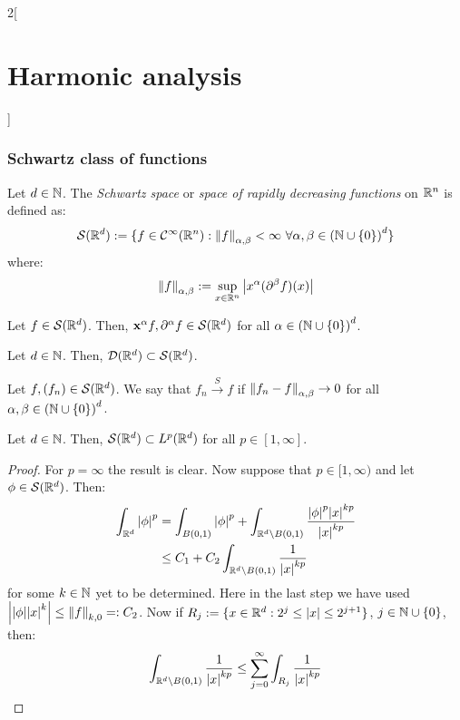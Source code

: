 \documentclass[../../../main_math.tex]{subfiles}
\begin{document}
\begin{multicols}{2}[\section{Harmonic analysis}]
  \subsubsection{Schwartz class of functions}
  \begin{definition}
    Let $d\in\mathbb{N}$. The \emph{Schwartz space} or \emph{space of rapidly decreasing functions} on $\mathbb{R}^n$ is defined as:
    $$
      \mathcal{S}(\RR^d):=\{f\in \mathcal{C}^\infty(\RR^n):\norm{f}_{\alpha,\beta}<\infty\ \forall\alpha,\beta\in{(\NN\cup\{0\})}^d\}
    $$
    where:
    $$
      \left\|f\right\|_{\alpha,\beta}:=\sup_{x\in\mathbb{R}^n}\abs{x^\alpha (\partial^\beta f)(x)}
    $$
  \end{definition}
  \begin{lemma}
    Let $f\in \mathcal{S}(\mathbb{R}^d)$. Then, ${\boldsymbol{\mathrm{x}}}^\alpha f,\partial^\alpha f\in \mathcal{S}(\mathbb{R}^d)$ for all $\alpha\in{(\ensuremath{\mathbb{N}}\cup\{0\})}^d$.
  \end{lemma}
  \begin{lemma}
    Let $d\in\mathbb{N}$. Then, $\mathcal{D}(\mathbb{R}^d)\subset\mathcal{S}(\mathbb{R}^d)$.
  \end{lemma}
  \begin{definition}
    Let $f,(f_n)\in \mathcal{S}(\mathbb{R}^d)$. We say that $f_n\overset{S}{\longrightarrow}f$ if $\left\|f_n-f\right\|_{\alpha,\beta}\to 0$ for all $\alpha,\beta\in{(\ensuremath{\mathbb{N}}\cup\{0\})}^d$.
  \end{definition}
  \begin{proposition}
    Let $d\in\mathbb{N}$. Then, $\mathcal{S}(\mathbb{R}^d)\subset L^p(\mathbb{R}^d)$ for all $p\in[1,\infty]$.
  \end{proposition}
  \begin{proof}
    For $p=\infty$ the result is clear. Now suppose that $p\in[1,\infty)$ and let $\phi\in \mathcal{S}(\mathbb{R}^d)$. Then:
    \begin{align*}
      \int_{\mathbb{R}^d}\abs{\phi}^p & = \int_{B(0,1)}\abs{\phi}^p+\int_{\mathbb{R}^d\setminus B(0,1)}\frac{\abs{\phi}^p\abs{x}^{kp}}{\abs{x}^{kp}} \\
                               & \leq C_1+C_2\int_{\mathbb{R}^d\setminus B(0,1)}\frac{1}{\abs{x}^{kp}}
    \end{align*}
    for some $k\in \mathbb{N}$ yet to be determined. Here in the last step we have used $\abs{\abs{\phi}\abs{x}^{k}}\leq \left\|f\right\|_{k,0}=:C_2$. Now if $R_j:=\{x\in\mathbb{R}^d:2^j\leq \abs{x}\leq 2^{j+1}\}$, $j\in\mathbb{N}\cup\{0\}$, then:
    \begin{align*}
      \int_{\RR^d\setminus B(0,1)}\frac{1}{\abs{x}^{kp}} & \leq \sum_{j=0}^\infty \int_{R_j}\frac{1}{\abs{x}^{kp}} \\

\end{align*}
\end{proof}
\end{multicols}
\end{document}
